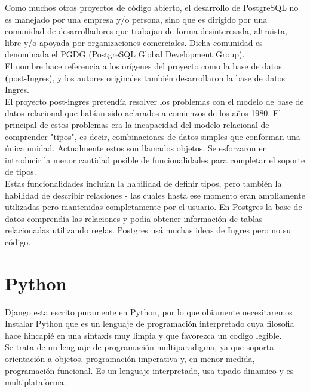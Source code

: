 Como muchos otros proyectos de código abierto, el desarrollo de PostgreSQL no es manejado por una empresa y/o persona, sino que es dirigido por una comunidad de desarrolladores que trabajan de forma desinteresada, altruista, libre y/o apoyada por organizaciones comerciales. Dicha comunidad es denominada el PGDG (PostgreSQL Global Development Group).\\[0.1cm]

El nombre hace referencia a los orígenes del proyecto como la base de datos \textbf(post-Ingres), y los autores originales también desarrollaron la base de datos Ingres. \\[0.1cm]

El proyecto post-ingres pretendía resolver los problemas con el modelo de base de datos relacional que habían sido aclarados a comienzos de los años 1980. El principal de estos problemas era la incapacidad del modelo relacional de comprender "tipos", es decir, combinaciones de datos simples que conforman una única unidad. Actualmente estos son llamados objetos. Se esforzaron en introducir la menor cantidad posible de funcionalidades para completar el soporte de tipos. \\[0.1cm]

Estas funcionalidades incluían la habilidad de definir tipos, pero también la habilidad de describir relaciones - las cuales hasta ese momento eran ampliamente utilizadas pero mantenidas completamente por el usuario. En Postgres la base de datos comprendía las relaciones y podía obtener información de tablas relacionadas utilizando reglas. Postgres usá muchas ideas de Ingres pero no su código. \\[0.1cm]




\section{Python}

Django esta escrito puramente en Python, por lo que obiamente necesitaremos Instalar Python que es un lenguaje de programación interpretado cuya filosofia hace  hincapié en una sintaxis muy limpia y que favorezca un codigo legible. \\[0.1cm]
 
Se trata de un lenguaje de programación multiparadigma, ya que soporta orientación a objetos, programación imperativa y, en menor medida, programación funcional. Es un lenguaje interpretado, usa tipado dinamico y es multiplataforma. \\[0.1cm]

